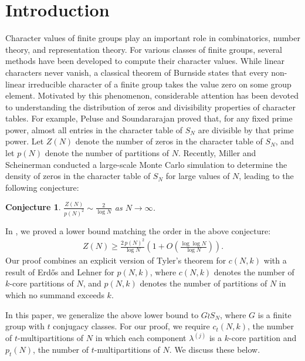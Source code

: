 \documentclass[11pt]{amsart}
\theoremstyle{plain}
\newtheorem{conjecture}[theorem]{Conjecture}
\numberwithin{equation}{section}
\begin{document}
	\section{Introduction}\label{section1}
	Character values of finite groups play an important role in combinatorics, number theory, and representation theory. For various classes of finite groups, several methods have been developed to compute their character values. 
	While linear characters never vanish, a classical theorem of Burnside \cite{burnside1904arithmetical} states that every non-linear irreducible character of a finite group takes the value zero on some group element. Motivated by this phenomenon, considerable attention has been devoted to understanding the distribution of zeros and divisibility properties of character tables. For example, Peluse and Soundararajan \cite{peluse} proved that, for any fixed prime power, almost all entries in the character table of $S_N$ are divisible by that prime power. Let $Z(N)$ denote the number of zeros in the character table of $S_N$, and let $p(N)$ denote the number of partitions of $N$. Recently, Miller and Scheinerman \cite{miller} conducted a large-scale Monte Carlo simulation to determine the density of zeros in the character table of $S_N$ for large values of $N$, leading to the following conjecture:
	\begin{conjecture}
		$\frac{Z(N)}{p(N)^{2}} \sim  \frac{2}{\log N}$ as $N \to \infty$.
	\end{conjecture}
	In \cite{barman1}, we proved a lower bound matching the order in the above conjecture:
	\begin{align}\label{eq-zerosSN}
		Z(N) \ge \frac{2\,p(N)^2}{\log N} \left(1 + O\left(\frac{\log\log N}{\log N}\right)\right).
	\end{align}
	Our proof combines an explicit version of Tyler's theorem \cite{tyler} for $c(N,k)$ with a result of  Erdős and Lehner \cite{erdos} for $p(N,k)$, where $c(N,k)$ denotes the number of $k$-core partitions of $N$, and $p(N,k)$ denotes the number of partitions of $N$ in which no summand exceeds $k$.
	
	In this paper, we generalize the above lower bound to $G\wr S_N$, where $G$ is a finite group with $t$ conjugacy classes. For our proof, we require $c_t(N,k)$, the number of $t$-multipartitions of $N$ in which each component $\lambda^{(j)}$ is a $k$-core partition and $p_t(N)$, the number of $t$-multipartitions of $N$. We discuss these below.
	
\end{document}
